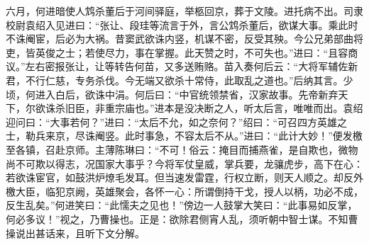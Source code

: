 六月，何进暗使人鸩杀董后于河间驿庭，举柩回京，葬于文陵。进托病不出。司隶校尉袁绍入见进曰：“张让、段珪等流言于外，言公鸩杀董后，欲谋大事。乘此时不诛阉宦，后必为大祸。昔窦武欲诛内竖，机谋不密，反受其殃。今公兄弟部曲将吏，皆英俊之士；若使尽力，事在掌握。此天赞之时，不可失也。”进曰：“且容商议。”左右密报张让，让等转告何苗，又多送贿赂。苗入奏何后云：“大将军辅佐新君，不行仁慈，专务杀伐。今无端又欲杀十常侍，此取乱之道也。”后纳其言。少顷，何进入白后，欲诛中涓。何后曰：“中官统领禁省，汉家故事。先帝新弃天下，尔欲诛杀旧臣，非重宗庙也。”进本是没决断之人，听太后言，唯唯而出。袁绍迎问曰：“大事若何？”进曰：“太后不允，如之奈何？”绍曰：“可召四方英雄之士，勒兵来京，尽诛阉竖。此时事急，不容太后不从。”进曰：“此计大妙！”便发檄至各镇，召赴京师。主薄陈琳曰：“不可！俗云：掩目而捕燕雀，是自欺也，微物尚不可欺以得志，况国家大事乎？今将军仗皇威，掌兵要，龙骧虎步，高下在心：若欲诛宦官，如鼓洪炉燎毛发耳。但当速发雷霆，行权立断，则天人顺之。却反外檄大臣，临犯京阙，英雄聚会，各怀一心：所谓倒持干戈，授人以柄，功必不成，反生乱矣。”何进笑曰：“此懦夫之见也！”傍边一人鼓掌大笑曰：“此事易如反掌，何必多议！”视之，乃曹操也。正是：欲除君侧宵人乱，须听朝中智士谋。不知曹操说出甚话来，且听下文分解。